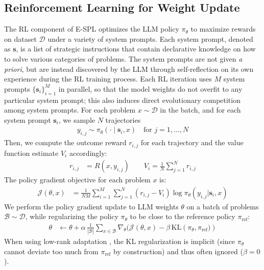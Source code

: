 \documentclass{article}
\theoremstyle{plain}
\theoremstyle{definition}
\theoremstyle{remark}
\begin{document}
\subsection{Reinforcement Learning for Weight Update}
The RL component of E-SPL optimizes the LLM policy $\pi_{\theta}$ to maximize rewards on dataset $\mathcal{D}$ under a variety of system prompts. Each system prompt, denoted as $\mathbf{s}$, is a list of strategic instructions that contain declarative knowledge on how to solve various categories of problems. The system prompts are not given \textit{a priori}, but are instead discovered by the LLM through self-reflection on its own experience during the RL training process. Each RL iteration uses $M$ system prompts $\{\mathbf{s}_{i}\}_{i=1}^{M}$ in parallel, so that the model weights do not overfit to any particular system prompt; this also induces direct evolutionary competition among system prompts.
For each problem $x\sim \mathcal{D}$ in the batch, and for each system prompt $\mathbf{s}_{i}$, we sample $N$ trajectories
\begin{align}
    y_{i,j}\sim \pi_{\theta}(\cdot \mid \mathbf{s}_{i}, x) \quad \text{for } j=1,\dots,N
\end{align}
Then, we compute the outcome reward $r_{i,j}$ for each trajectory and the value function estimate $V_{i}$ accordingly:
\begin{align}
    r_{i,j} &= R(x,y_{i,j}) \qquad V_{i} = \textstyle\frac{1}{N} {\textstyle\sum}_{j=1}^{N} r_{i,j}
\label{eq:value-function-def}
\end{align}
The policy gradient objective for each problem $x$ is:
\begin{align*}
    \mathcal{J}(\theta, x) &= {\textstyle\frac{1}{NM}} {\textstyle\sum_{i=1}^{M}} {\textstyle\sum}_{j=1}^{N} ( r_{i,j} - V_{i} ) \log \pi_{\theta}( y_{i,j}| \mathbf{s}_{i}, x)
\end{align*}
We perform the policy gradient update to LLM weights $\theta$ on a batch of problems $\mathcal{B} \sim \mathcal{D}$, while regularizing the policy $\pi_{\theta}$ to be close to the reference policy $\pi_{\text{ref}}$:
\begin{align}
    \theta &\leftarrow \theta + \alpha \, {\textstyle\frac{1}{ |\mathcal{B}| }} {\sum}_{x \in \mathcal{B}} \nabla_{\theta} (\mathcal{J}(\theta, x) - \beta \, \mathrm{KL} \left( \pi_{\theta}, \pi_{\text{ref}}) \right)
\end{align}
When using low-rank adaptation \cite{lora}, the KL regularization is implicit (since $\pi_{\theta}$ cannot deviate too much from $\pi_{\text{ref}}$ by construction) and thus often ignored ($\beta=0$).
\end{document}

